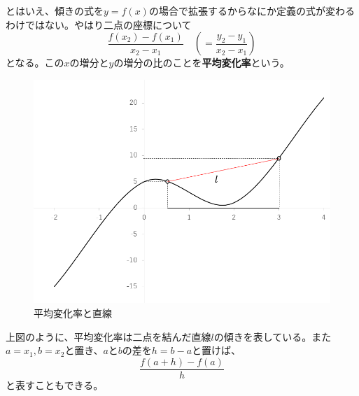 \documentclass[a4j,dvipdfmx]{jsarticle}
\begin{document}
            とはいえ、傾きの式を$y=f(x)$の場合で拡張するからなにか定義の式が変わるわけではない。やはり二点の座標について
            \begin{equation}
                \frac{f(x_2)-f(x_1)}{x_2-x_1}\quad\left(=\frac{y_2-y_1}{x_2-x_1}\right)
            \end{equation}
            となる。この$x$の増分と$y$の増分の比のことを\textbf{平均変化率}という。
            \begin{figure}[h]
                \centering
                \includegraphics[scale=0.3]{img/QuuNote/heikinhenkaritu.png}
                \caption{平均変化率と直線}
            \end{figure}

            上図のように、平均変化率は二点を結んだ直線$l$の傾きを表している。また$a=x_1,b=x_2$と置き、$a$と$b$の差を$h=b-a$と置けば、
            \begin{equation}
                \frac{f(a+h)-f(a)}{h}
            \end{equation}
            と表すこともできる。
            
\end{document}

